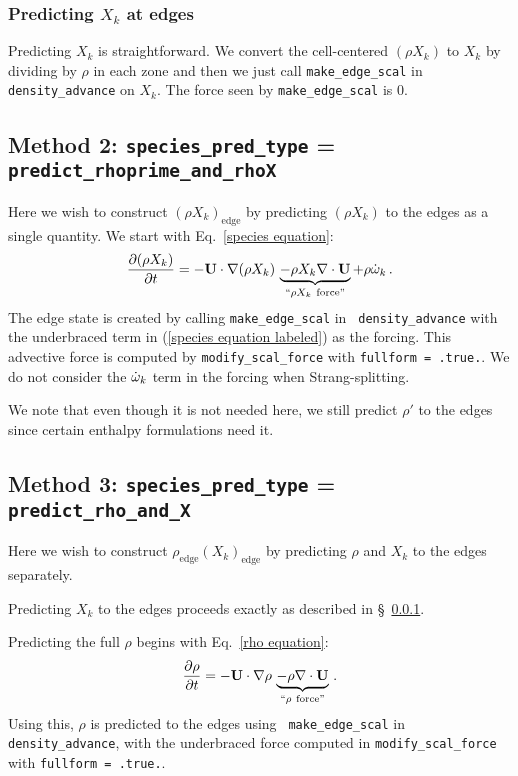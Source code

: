 \subsubsection{Predicting $X_k$ at edges}
\label{sec:pert:predict_X}
Predicting $X_k$ is straightforward.  We convert the cell-centered
$(\rho X_k)$ to $X_k$ by dividing by $\rho$ in each zone and then we
just call {\tt make\_edge\_scal} in {\tt density\_advance} on $X_k$.
The force seen by {\tt make\_edge\_scal} is 0.


\subsection{Method 2: {\tt species\_pred\_type} = {\tt predict\_rhoprime\_and\_rhoX}}

Here we wish to construct $(\rho X_k)_\mathrm{edge}$ by predicting
$(\rho X_k)$ to the edges as a single quantity.  We start with
Eq.~\ref{species equation}:
\begin{equation}
\frac{\partial(\rho X_k)}{\partial t} =
  -{\bf U}\cdot\nabla(\rho X_k) \, \underbrace{-\rho X_k \nabla\cdot{\bf U}}_{``\rho X_k ~\text{force''}} + \rho \dot{\omega}_k \, . \label{species equation labeled}
\end{equation}
The edge state is created by calling {\tt make\_edge\_scal} in {\tt
  density\_advance} with the underbraced term in (\ref{species
  equation labeled}) as the forcing.  This advective force is computed
by {\tt modify\_scal\_force} with {\tt fullform = .true.}.  We do not
consider the $\dot{\omega}_k$ term in the forcing when Strang-splitting.


We note that even though it is not needed here, we still predict
$\rho'$ to the edges since certain enthalpy formulations need it.


\subsection{Method 3: {\tt species\_pred\_type} = {\tt predict\_rho\_and\_X}}

Here we wish to construct $\rho_\mathrm{edge} (X_k)_\mathrm{edge}$
by predicting $\rho$ and $X_k$ to the edges separately.

Predicting $X_k$ to the edges proceeds exactly as described in
\S~\ref{sec:pert:predict_X}.  

Predicting the full $\rho$ begins with Eq.~\ref{rho equation}:
\begin{equation}
\frac{\partial\rho}{\partial t} 
= -{\bf U}\cdot\nabla\rho \, \underbrace{- \rho\nabla\cdot{\bf U}}_{``\rho~\text{force''}} \, . \label{rho equation labeled}
\end{equation}
Using this, $\rho$ is predicted to the edges using {\tt
  make\_edge\_scal} in {\tt density\_advance}, with the underbraced
force computed in {\tt modify\_scal\_force} with {\tt fullform =
  .true.}.

